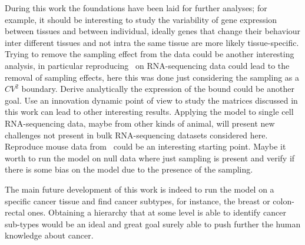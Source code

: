 During this work the foundations have been laid for further analyses; for example, it should be interesting to study the variability of gene expression between tissues and between individual, ideally genes that change their behaviour inter different tissues and not intra the same tissue are more likely tissue-specific. Trying to remove the sampling effect from the data could be another interesting analysis, in particular reproducing~\cite{Grilli} on RNA-sequencing data could lead to the removal of sampling effects, here this was done just considering the sampling as a $CV^2$ boundary. Derive analytically the expression of the bound could be another goal. Use an innovation dynamic point of view to study the matrices discussed in this work can lead to other interesting results. Applying the model to single cell RNA-sequencing data, maybe from other kinds of animal, will present new challenges not present in bulk RNA-sequencing datasets considered here. Reproduce mouse data from~\cite{Scialdone2016} could be an interesting starting point. Maybe it worth to run the model on null data where just sampling is present and verify if there is some bias on the model due to the presence of the sampling.

The main future development of this work is indeed to run the model on a specific cancer tissue and find cancer subtypes, for instance, the breast or colon-rectal ones. Obtaining a hierarchy that at some level is able to identify cancer sub-types would be an ideal and great goal surely able to push further the human knowledge about cancer. 